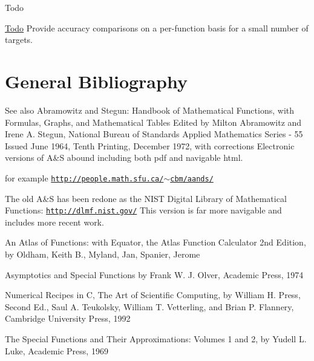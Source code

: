 \begin{DoxyRefDesc}{Todo}
\item[\hyperlink{todo__todo000001}{Todo}]Provide accuracy comparisons on a per-\/function basis for a small number of targets.\end{DoxyRefDesc}
\hypertarget{index_bibliography}{}\section{General Bibliography}\label{index_bibliography}
\begin{DoxySeeAlso}{See also}
Abramowitz and Stegun\+: Handbook of Mathematical Functions, with Formulas, Graphs, and Mathematical Tables Edited by Milton Abramowitz and Irene A. Stegun, National Bureau of Standards Applied Mathematics Series -\/ 55 Issued June 1964, Tenth Printing, December 1972, with corrections Electronic versions of A\&S abound including both pdf and navigable html. 

for example \href{http://people.math.sfu.ca/~cbm/aands/}{\tt http\+://people.\+math.\+sfu.\+ca/$\sim$cbm/aands/}

The old A\&S has been redone as the N\+I\+ST Digital Library of Mathematical Functions\+: \href{http://dlmf.nist.gov/}{\tt http\+://dlmf.\+nist.\+gov/} This version is far more navigable and includes more recent work.

An Atlas of Functions\+: with Equator, the Atlas Function Calculator 2nd Edition, by Oldham, Keith B., Myland, Jan, Spanier, Jerome

Asymptotics and Special Functions by Frank W. J. Olver, Academic Press, 1974

Numerical Recipes in C, The Art of Scientific Computing, by William H. Press, Second Ed., Saul A. Teukolsky, William T. Vetterling, and Brian P. Flannery, Cambridge University Press, 1992

The Special Functions and Their Approximations\+: Volumes 1 and 2, by Yudell L. Luke, Academic Press, 1969 
\end{DoxySeeAlso}
